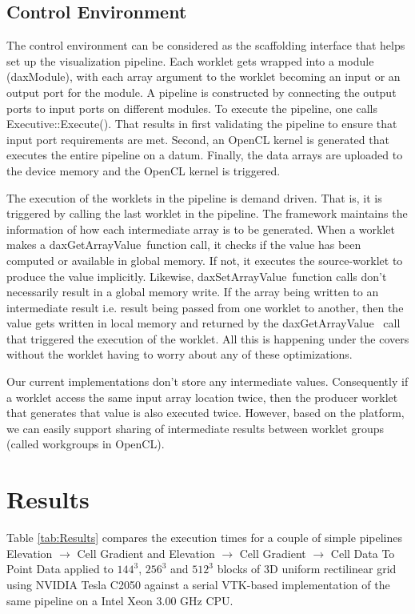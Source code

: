 \documentclass{vgtc}                          %
\begin{document}
\subsection{Control Environment}
\label{sec:ControlEnvironment}

The control environment can be considered as the scaffolding interface that helps set up the
visualization pipeline. Each worklet gets wrapped into a module (daxModule),
with each array argument to the worklet becoming an input or an output port for
the module. A pipeline is constructed by connecting the output ports to input
ports on different modules. To execute the pipeline, one calls
Executive::Execute(). That results in first validating the pipeline to ensure
that input port requirements are met. Second, an OpenCL kernel is generated that
executes the entire pipeline on a datum. Finally, the data arrays are
uploaded to the device memory and the OpenCL kernel is triggered.

The execution of the worklets in the pipeline is demand driven. That is, it is
triggered by calling the last worklet in the pipeline. The framework maintains
the information of how each intermediate array is to be generated. When a
worklet makes a daxGetArrayValue\textasteriskcentered~function call, it checks
if the value has been computed or available in global memory. If not, it
executes the source-worklet to produce the value implicitly. Likewise,
daxSetArrayValue\textasteriskcentered~function calls don't necessarily result
in a global memory write. If the array being written to an intermediate result
i.e. result being passed from one worklet to another, then the value gets
written in local memory and returned by the
daxGetArrayValue\textasteriskcentered~ call that triggered the execution of the
worklet. All this is happening under the covers without the worklet having to
worry about any of these optimizations.

Our current implementations don't store any intermediate values. Consequently if
a worklet access the same input array location twice, then the producer worklet
that generates that value is also executed twice. However, based on the
platform, we can easily support sharing of intermediate results between worklet
groups (called workgroups in OpenCL).

\section{Results}
\label{sec:Results}

Table \ref{tab:Results} compares the execution times for a couple of simple
pipelines Elevation $\rightarrow$ Cell Gradient and Elevation $\rightarrow$
Cell Gradient $\rightarrow$ Cell Data To Point Data applied to $144^3$, $256^3$
and $512^3$ blocks of 3D uniform
rectilinear grid using NVIDIA Tesla C2050 against a serial VTK-based
implementation of the same pipeline on a Intel Xeon 3.00 GHz CPU.
\end{document}
